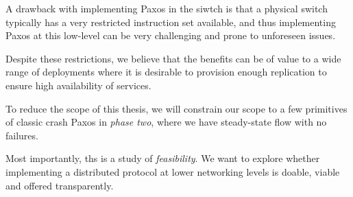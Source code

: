 A drawback with implementing Paxos in the siwtch is that a physical switch
typically has a very restricted instruction set available, and thus
implementing Paxos at this low-level can be very challenging and prone to
unforeseen issues.

Despite these restrictions, we believe that the benefits can be of value to
a wide range of deployments where it is desirable to provision enough
replication to ensure high availability of services.

To reduce the scope of this thesis,
we will constrain our scope to a few primitives of
classic crash Paxos in \textit{phase two},
where we have steady-state
flow with no failures.

Most importantly, ths is a study of \textit{feasibility}.
We want to explore whether implementing a distributed protocol at lower networking
levels is doable, viable and offered transparently.
